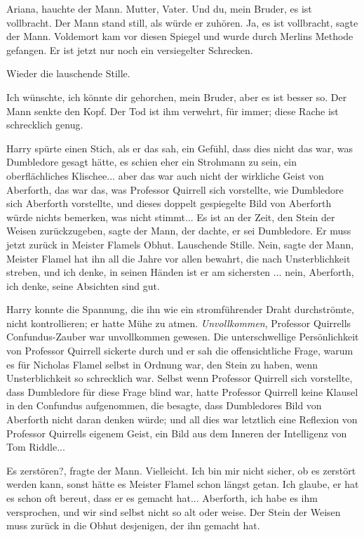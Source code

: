 \glqq{}Ariana\grqq{}, hauchte der Mann. \glqq{}Mutter, Vater. Und du, mein Bruder,
es ist vollbracht.\grqq{} Der Mann stand still, als würde er zuhören. \glqq{}Ja,
es ist vollbracht\grqq{}, sagte der Mann. \glqq{}Voldemort kam vor diesen Spiegel
und wurde durch Merlins Methode gefangen. Er ist jetzt nur noch ein versiegelter
Schrecken.\grqq{}

Wieder die lauschende Stille.

\glqq{}Ich wünschte, ich könnte dir gehorchen, mein Bruder, aber es ist besser
so.\grqq{} Der Mann senkte den Kopf. \glqq{}Der Tod ist ihm verwehrt, für immer;
diese Rache ist schrecklich genug.\grqq{}

Harry spürte einen Stich, als er das sah, ein Gefühl, dass dies nicht das war,
was Dumbledore gesagt hätte, es schien eher ein Strohmann zu sein, ein
oberflächliches Klischee... aber das war auch nicht der wirkliche Geist von
Aberforth, das war das, was Professor Quirrell sich vorstellte, wie Dumbledore
sich Aberforth vorstellte, und dieses doppelt gespiegelte Bild von Aberforth
würde nichts bemerken, was nicht stimmt... \glqq{}Es ist an der Zeit, den Stein
der Weisen zurückzugeben\grqq{}, sagte der Mann, der dachte, er sei Dumbledore.
\glqq{}Er muss jetzt zurück in Meister Flamels Obhut.\grqq{} Lauschende Stille.
\glqq{}Nein\grqq{}, sagte der Mann, \glqq{}Meister Flamel hat ihn all die Jahre
vor allen bewahrt, die nach Unsterblichkeit streben, und ich denke, in seinen
Händen ist er am sichersten ... nein, Aberforth, ich denke, seine Absichten sind
gut.\grqq{}

Harry konnte die Spannung, die ihn wie ein stromführender Draht durchströmte,
nicht kontrollieren; er hatte Mühe zu atmen. \emph{Unvollkommen}, Professor
Quirrells Confundus-Zauber war unvollkommen gewesen. Die unterschwellige
Persönlichkeit von Professor Quirrell sickerte durch und er sah die
offensichtliche Frage, warum es für Nicholas Flamel selbst in Ordnung war, den
Stein zu haben, wenn Unsterblichkeit so schrecklich war. Selbst wenn Professor
Quirrell sich vorstellte, dass Dumbledore für diese Frage blind war, hatte
Professor Quirrell keine Klausel in den Confundus aufgenommen, die besagte, dass
Dumbledores Bild von Aberforth nicht daran denken würde; und all dies war
letztlich eine Reflexion von Professor Quirrells eigenem Geist, ein Bild aus dem
Inneren der Intelligenz von Tom Riddle...

\glqq{}Es zerstören?\grqq{}, fragte der Mann. \glqq{}Vielleicht. Ich bin mir nicht
sicher, ob es zerstört werden kann, sonst hätte es Meister Flamel schon längst
getan. Ich glaube, er hat es schon oft bereut, dass er es gemacht hat...
Aberforth, ich habe es ihm versprochen, und wir sind selbst nicht so alt oder
weise. Der Stein der Weisen muss zurück in die Obhut desjenigen, der ihn gemacht
hat.\grqq{}

